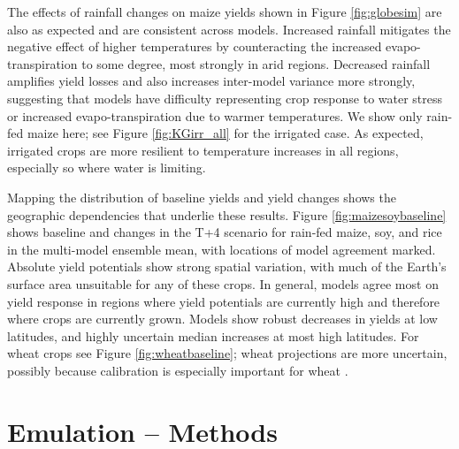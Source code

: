 \documentclass[esd, final]{copernicus} %
\begin{document}
The effects of rainfall changes on maize yields shown in Figure \ref{fig:globesim} are also as expected and are consistent across models. Increased rainfall mitigates the negative effect of higher temperatures by counteracting the increased evapo-transpiration to some degree, most strongly in arid regions. Decreased rainfall amplifies yield losses and also increases inter-model variance more strongly, suggesting that models have difficulty representing crop response to water stress or increased evapo-transpiration due to warmer temperatures.  We show only rain-fed maize here; see Figure \ref{fig:KGirr_all} for the irrigated case. As expected, irrigated crops are more resilient to temperature increases in all regions, especially so where water is limiting.  

Mapping the distribution of baseline yields and yield changes shows the geographic dependencies that underlie these results. Figure \ref{fig:maizesoybaseline} shows baseline and changes in the T+4 scenario for rain-fed maize, soy, and rice in the multi-model ensemble mean, with locations of model agreement marked. Absolute yield potentials show strong spatial variation, with much of the Earth's surface area unsuitable for any of these crops. In general, models agree most on yield response in regions where yield potentials are currently high and therefore where crops are currently grown. Models show robust decreases in yields at low latitudes, and highly uncertain median increases at most high latitudes. For wheat crops see Figure \ref{fig:wheatbaseline}; wheat projections are more uncertain, possibly because calibration is especially important for wheat \citep[e.g.][]{Asseng2013}.


\section{Emulation -- Methods}
\label{S:4}
\end{document}
